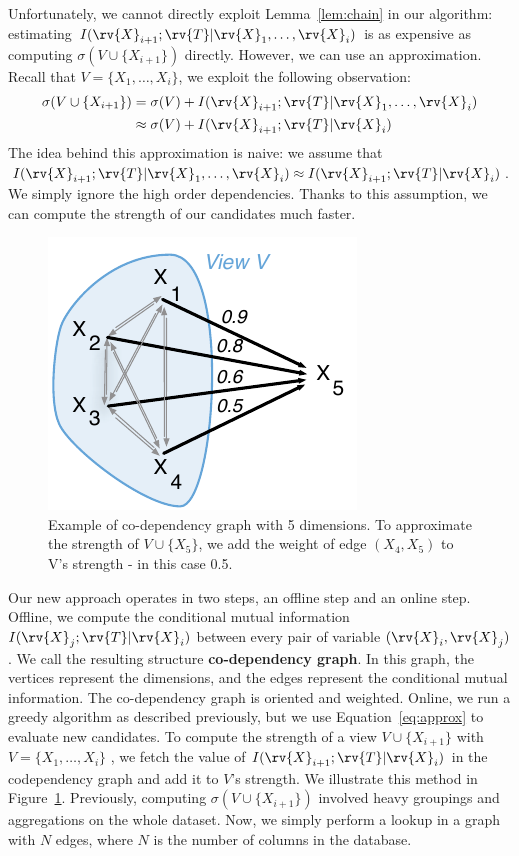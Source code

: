 Unfortunately, we cannot directly exploit Lemma~\ref{lem:chain} in our
algorithm: estimating $I(\rv{X}_{i+1} ; \rv{T} | \rv{X}_1 , \ldots, \rv{X}_i)$
is as expensive as computing $\sigma(V \cup \{X_{i+1}\}) $ directly.  However,
we can use an approximation.  Recall that $V = \{X_1, \ldots, X_i\}$, we
exploit the following observation:
\begin{equation}\label{eq:approx}
\begin{split}
    \sigma(V \cup \{X_{i+1}\}) & = \sigma(V)   + I(\rv{X}_{i+1} ; \rv{T} |
    \rv{X}_1, \ldots, \rv{X}_{i})\\
    & \approx \sigma(V) + I(\rv{X}_{i+1} ; \rv{T} | \rv{X}_{i})
\end{split}
\end{equation}
The idea behind this approximation is naive: we assume that $I(\rv{X}_{i+1} ;
\rv{T} | \rv{X}_1, \ldots, \rv{X}_{i}) \approx I(\rv{X}_{i+1} ; \rv{T} |
\rv{X}_{i})$. We simply ignore the high order dependencies. Thanks to this
assumption, we can compute the strength of our candidates much faster. 

\begin{figure}[t!]
\centering
\includegraphics[width=0.5\columnwidth]{images/codependency}
\caption{Example of co-dependency graph with 5 dimensions. To approximate the
strength of $V \cup \{X_5\}$, we add the weight of edge $(X_4, X_5)$ to V's
strength -  in this case 0.5.}
\label{pic:codependency}
\end{figure}
Our new approach operates in two steps, an offline step and an online step.
Offline, we compute the conditional mutual information  $ I(\rv{X}_j ; \rv{T} |
\rv{X}_i)$ between every pair of variable $(\rv{X}_i, \rv{X}_j)$. We call the
resulting structure \textbf{co-dependency graph}. In this graph, the vertices
represent the dimensions, and the edges represent the conditional mutual
information. The co-dependency graph is oriented and weighted.  Online, we run
a greedy algorithm as described previously, but we use Equation~\ref{eq:approx}
to evaluate new candidates.  To compute the strength of a view $V \cup
\{X_{i+1}\}$ with  $V= \{X_1, \ldots, X_i\}$ , we fetch the value of  $
I(\rv{X}_{i+1} ; \rv{T} | \rv{X}_i)$ in the codependency graph and add it to
$V$'s strength. We illustrate this method in Figure~\ref{pic:codependency}.
Previously, computing $\sigma(V \cup \{X_{i+1}\})$ involved heavy groupings and
aggregations on the whole dataset.  Now, we simply perform a lookup in a graph
with $N$ edges, where $N$ is the number of columns in the database.


